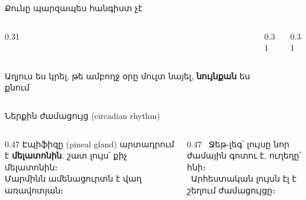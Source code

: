 \begin{frame}{Քունը պարզապես հանգիստ չէ}
  \begin{columns}[T]
    \begin{column}{0.31\textwidth}
      \begin{card}
        \centering{}\ \par\smallskip
        Աղյուս ես կրել, թե ամբողջ օրը մուլտ նայել, \textbf{նույնքան} ես քնում
      \end{card}
    \end{column}
    \begin{column}{0.31\textwidth}
    \end{column}
    \begin{column}{0.31\textwidth}
    \end{column}
  \end{columns}
  \vspace{2mm}
\end{frame}

\begin{frame}{Ներքին ժամացույց (circadian rhythm)}
  \centering
  \par\smallskip
  \begin{columns}[T]
    \begin{column}{0.47\textwidth}
      \small Էպիֆիզը (pineal gland) արտադրում է \textbf{մելատոնին}. շատ լույս՝ քիչ մելատոնին։\\
      Մարմինն ամենացուրտն է վաղ առավոտյան։
    \end{column}
    \begin{column}{0.47\textwidth}
      \small{}\ Ջեթ-լեգ՝ լույսը նոր ժամային գոտու է, ուղեղը՝ հնի։\\ \ Արհեստական լույսն էլ է շեղում ժամացույցը։
    \end{column}
  \end{columns}
\end{frame}

